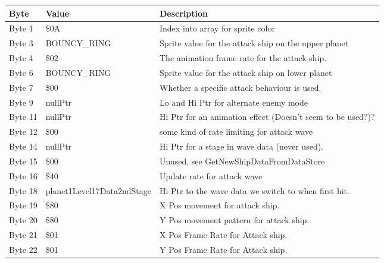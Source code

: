 \begin{figure}[H]
{\begin{adjustbox}{width=12cm}
\begin{tabular}{lll}
\toprule
 Byte    & Value                      & Description                                                        \\
\midrule
 Byte 1  & \$0A                        & Index into array for sprite color                                  \\
 Byte 3  & BOUNCY\_RING                & Sprite value for the attack ship on the upper planet               \\
 Byte 4  & \$02                        & The animation frame rate for the attack ship.                      \\
 Byte 6  & BOUNCY\_RING                & Sprite value for the attack ship on lower planet                   \\
 Byte 7  & \$00                        & Whether a specific attack behaviour is used.                       \\
 Byte 9  & nullPtr                    & Lo and Hi Ptr for alternate enemy mode                             \\
 Byte 11 & nullPtr                    & Hi Ptr for an animation effect (Doesn't seem to be used?)?         \\
 Byte 12 & \$00                        & some kind of rate limiting for attack wave                         \\
 Byte 14 & nullPtr                    & Hi Ptr for a stage in wave data (never used).                      \\
 Byte 15 & \$00                        & Unused, see GetNewShipDataFromDataStore                            \\
 Byte 16 & \$40                        & Update rate for attack wave                                        \\
 Byte 18 & planet1Level17Data2ndStage & Hi Ptr to the wave data we switch to when first hit.               \\
 Byte 19 & \$80                        & X Pos movement for attack ship.                                    \\
 Byte 20 & \$80                        & Y Pos movement pattern for attack ship.                            \\
 Byte 21 & \$01                        & X Pos Frame Rate for Attack ship.                                  \\
 Byte 22 & \$01                        & Y Pos Frame Rate for Attack ship.                                  \\

\end{tabular}
\end{adjustbox}}
\end{figure}
